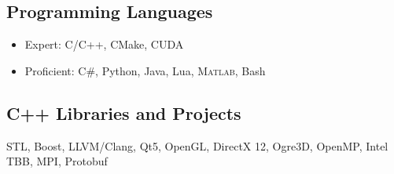 \subsection{Programming Languages}
\begin{itemize}
\item Expert: C/C++, CMake, CUDA
\item Proficient: C\#, Python, Java, Lua, \textsc{Matlab}, Bash
\end{itemize}

\subsection{C++ Libraries and Projects}
STL, Boost, LLVM/Clang, Qt5, OpenGL, DirectX 12, Ogre3D, OpenMP, Intel TBB, MPI, Protobuf

